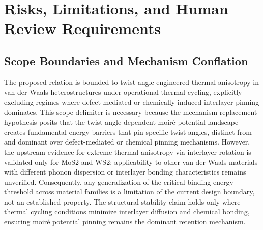 \documentclass[conference]{IEEEtran}
\begin{document}
\section{Risks, Limitations, and Human Review Requirements}
\subsection{Scope Boundaries and Mechanism Conflation}
The proposed relation is bounded to twist-angle-engineered thermal anisotropy in van der Waals heterostructures under operational thermal cycling, explicitly excluding regimes where defect-mediated or chemically-induced interlayer pinning dominates. This scope delimiter is necessary because the mechanism replacement hypothesis posits that the twist-angle-dependent moiré potential landscape creates fundamental energy barriers that pin specific twist angles, distinct from and dominant over defect-mediated or chemical pinning mechanisms. However, the upstream evidence for extreme thermal anisotropy via interlayer rotation is validated only for MoS2 and WS2; applicability to other van der Waals materials with different phonon dispersion or interlayer bonding characteristics remains unverified. Consequently, any generalization of the critical binding-energy threshold across material families is a limitation of the current design boundary, not an established property. The structural stability claim holds only where thermal cycling conditions minimize interlayer diffusion and chemical bonding, ensuring moiré potential pinning remains the dominant retention mechanism.~\cite{cite_26ecaf73d88dfe33,cite_6b49ace365c37cc5,cite_b9cc1fcb55e94349}
\end{document}
